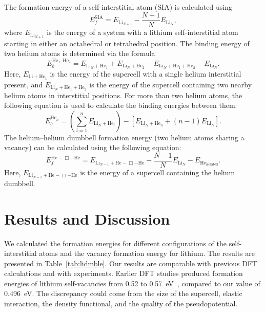The formation energy of a self-interstitial atom (SIA) is calculated using
\begin{equation}
E_f^{\text{SIA}} = E_{\text{Li}_{N+1}} - \frac{N+1}{N} E_{\text{Li}_N},
\end{equation}
where $E_{\text{Li}_{N+1}}$ is the energy of a system with a lithium
self-interstitial atom starting in either an octahedral or tetrahedral
position. The binding energy of two helium atoms is determined via the formula
\begin{equation}
E_b^{\text{He}_1\text{--}\text{He}_2}
    = E_{\text{Li}_{N}+\text{He}_1} + E_{\text{Li}_{N}+\text{He}_2}
        - E_{\text{Li}_N+\text{He}_1 + \text{He}_2} - E_{\text{Li}_N}.
\end{equation}
Here, $E_{\text{Li}+\text{He}_1}$ is the energy of the supercell with a
single helium interstitial present, and
$E_{\text{Li}_N+\text{He}_1 + \text{He}_2}$
is the energy of the supercell containing two nearby helium atoms in
interstitial positions. For more than two helium atoms, the following equation
is used to calculate the binding energies between them:
\begin{equation}
E_b^{\text{He}_n} = \left (\sum_{i=1}^n E_{\text{Li}_N+\text{He}_i} \right ) - \left[ E_{\text{Li}_N+\text{He}_n} + (n-1)E_{\text{Li}_N} \right].
\end{equation}
The helium--helium dumbbell formation energy (two helium atoms sharing a vacancy) can be calculated using the following equation:
\begin{equation}\label{eq_hedmbl}
  E_f^{\text{He}-\Box-\text{He}}
  = E_{\text{Li}_{N-1}+\text{He}-\Box-\text{He}}
    - \frac{N-1}{N} E_{\text{Li}_N} - E_{\text{He}_{\text{isolated}}}.
\end{equation}
Here, $E_{\text{Li}_{N-1}+\text{He}-\Box-\text{He}}$ is the energy of a supercell containing the helium dumbbell.

\section{Results and Discussion}
We calculated the formation energies for different configurations of the
self-interstitial atoms and the vacancy formation energy for lithium. The
results are presented in Table~\ref{tab:lidmble}. Our results are comparable
with previous DFT calculations and with experiments. Earlier DFT studies
produced formation energies of lithium self-vacancies from 0.52 to
0.57~eV~\cite{benedek1992formation, Pawellek_1991, frank1993properties,
frank1996first}, compared to our value of 0.496~eV\@. The discrepancy could
come from the size of the supercell, elastic interaction, the density
functional, and the quality of the pseudopotential.

